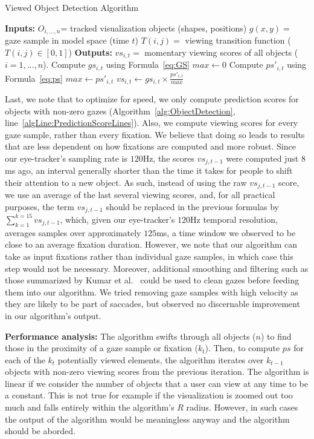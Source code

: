 \begin{algorithm}
\caption{Viewed Object Detection Algorithm}
\label{alg:ObjectDetection}
\begin{algorithmic}[1]
\State \textbf{Inputs: } 
\Statex $O_{i, \ldots, n}$= tracked visualization objects (shapes, positions)
\Statex $g(x,y) = $ gaze sample in model space (time $t$)
\Statex $T(i,j) = $ viewing transition function ($T(i,j) \in [0,1]$)
\State \textbf{Outputs:}
\Statex $vs_{i,t} = $ momentary viewing scores of all objects ($i = 1, \ldots, n$). 
	\State Compute $gs_{i,t}$	using Formula~\ref{eq:GS}
\EndFor
\State $max \gets 0$
	 \label{algLine:PredictionScoreLines}
		\State Compute $ps'_{i,t}$	using Formula~\ref{eq:ps}
			\State $max \gets ps'_{i,t}$
		\EndIf
	\EndIf
\EndFor
{}
	\State $vs_{i,t} \gets gs_{i,t} \times \frac{ps'_{i,t}}{max} $
\EndFor
\end{algorithmic}
\end{algorithm}

Last, we note that to optimize for speed, we only compute prediction scores for objects with non-zero gazes (Algorithm~\ref{alg:ObjectDetection}, line~\ref{algLine:PredictionScoreLines}). Also, we compute viewing scores for every gaze sample, rather than every fixation. We believe that doing so leads to results that are less dependent on how fixations are computed and more robust. Since our eye-tracker's sampling rate is $120$Hz, the scores $vs_{j, t-1}$ were computed just $8$ms ago, an interval generally shorter than the time it takes for people to shift their attention to a new object. As such, instead of using the raw $vs_{j,t-1}$ score, we use an average of the last several viewing scores, and, for all practical purposes, the term $vs_{j,t-1}$ should be replaced in the previous formulas by $ \sum_{k=1}^{k=15}{vs_{j,t-1}}$, which, given our eye-tracker's $120$Hz temporal resolution, averages samples over approximately $125$ms, a time window we observed to be close to an average fixation duration.  However, we note that our algorithm can take as input fixations rather than individual gaze samples, in which case this step would not be necessary. Moreover, additional smoothing and filtering such as those summarized by Kumar et al.~\cite{kumar2008improving} could be used to clean gazes before feeding them into our algorithm. We tried removing gaze samples with high velocity as they are likely to be part of saccades, but observed no discernable improvement in our algorithm's output. 


{\bf Performance analysis:} The algorithm swifts through all objects ($n$) to find those in the proximity of a gaze sample or fixation ($k_t$). Then, to compute $ps$ for each of the $k_t$ potentially viewed elements, the algorithm iterates over $k_{t-1}$ objects with non-zero viewing scores from the previous iteration. The algorithm is linear if we consider the number of objects that a user can view at any time to be a constant. This is not true for example if the visualization is zoomed out too much and falls entirely within the algorithm's $R$ radius. However, in such cases the output of the algorithm would be meaningless anyway and the algorithm should be aborded.
